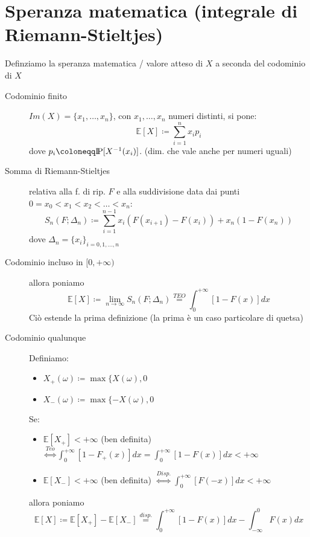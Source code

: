 \documentclass[a4paper,10pt]{article}
\newcommand{\pr}{\text{I\kern-0.15em P}} %
\newcommand{\ex}{\mathbb{E}} %
\theoremstyle{remark}
\theoremstyle{definition}
\begin{document}
\pagebreak
\part{Speranza matematica (integrale di Riemann-Stieltjes)}
Definziamo la speranza matematica / valore atteso di $X$ a seconda del codominio di $X$

\begin{description}
    \item[Codominio finito] $Im(X)=\{x_1,\dots,x_n\}$, con $x_1,\dots,x_n$ numeri distinti, si pone:
    $$\ex[X]\coloneqq\sum_{i=1}^nx_ip_i$$
    dove $p_i\coloneqq\pr[X^{-1}(x_i)]$. (dim. che vale anche per numeri uguali)
    \item[Somma di Riemann-Stieltjes] relativa alla f. di rip. $F$ e alla suddivisione data dai punti $0=x_0<x_1<x_2<\dots<x_n$:
    $$S_n(F;\Delta_n)\coloneqq \sum_{i=1}^{n-1}x_i(F(x_{i+1})-F(x_i))+x_n(1-F(x_n))$$
    dove $\Delta_n=\{x_i\}_{i=0,1,\dots,n}$
    \item[Codominio incluso in $[0,+\infty)$] allora poniamo
    $$\ex[X]\coloneqq \lim_{n\to\infty}S_n(F;\Delta_n) \overset{TEO}{=}\int_0^{+\infty}[1-F(x)]dx$$
    Ciò estende la prima definizione (la prima è un caso particolare di quetsa)
    \item[Codominio qualunque] Definiamo:
    \begin{itemize}
        \item $X_+(\omega)\coloneqq\max\{X(\omega),0$
        \item $X_-(\omega)\coloneqq\max\{-X(\omega),0$
    \end{itemize}
    Se:
    \begin{itemize}
        \item $\ex[X_+]<+\infty$ (ben definita) $\overset{Teo}{\iff}\int_0^{+\infty}[1-F_+(x)]dx=\int_0^{+\infty}[1-F(x)]dx < +\infty$
        \item $\ex[X_-]<+\infty$ (ben definita) $\overset{Disp.}{\iff}\int_0^{+\infty}[F(-x)]dx < +\infty$
    \end{itemize}
    allora poniamo
    $$\ex[X]\coloneqq \ex[X_+]-\ex[X_-]\overset{disp.}{=}\int_0^{+\infty}[1-F(x)]dx-\int_{-\infty}^0F(x)dx$$


\end{description}
\end{document}
